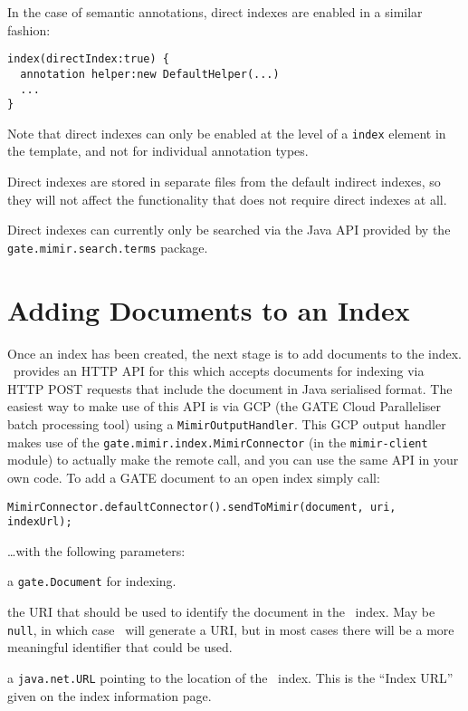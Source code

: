 In the case of semantic annotations, direct indexes are enabled in a similar
fashion:
\begin{lstlisting}
index(directIndex:true) {
  annotation helper:new DefaultHelper(...)
  ...
}
\end{lstlisting}

Note that direct indexes can only be enabled at the level of a {\tt index}
element in the template, and not for individual annotation types.

Direct indexes are stored in separate files from the default indirect indexes,
so they will not affect the functionality that does not require direct indexes
at all.

Direct indexes can currently only be searched via the Java API provided by the
{\tt gate.mimir.search.terms} package.

\section{Adding Documents to an Index}\label{sec:indexing:add-docs}

Once an index has been created, the next stage is to add documents to the
index.  \Mimir\ provides an HTTP API for this which accepts documents for
indexing via HTTP POST requests that include the document in Java serialised
format.  The easiest way to make use of this API is via GCP (the GATE Cloud
Paralleliser batch processing tool) using a \lstinline!MimirOutputHandler!.
This GCP output handler makes use of the
\lstinline!gate.mimir.index.MimirConnector! (in the {\tt mimir-client} module)
to actually make the remote call, and you can use the same API in your own
code.  To add a GATE document to an open index simply call:
\begin{lstlisting}[breaklines]
MimirConnector.defaultConnector().sendToMimir(document, uri, indexUrl);
\end{lstlisting}
%
\ldots{}with the following parameters:
\bde
\item[document] a \lstinline!gate.Document! for indexing.
\item[uri] the URI that should be used to identify the document in the \Mimir\
  index.  May be \lstinline!null!, in which case \Mimir\ will generate a URI,
  but in most cases there will be a more meaningful identifier that could be
  used.
\item[indexUrl] a \lstinline!java.net.URL! pointing to the location of the
  \Mimir\ index.  This is the ``Index URL'' given on the index information page.
\ede

